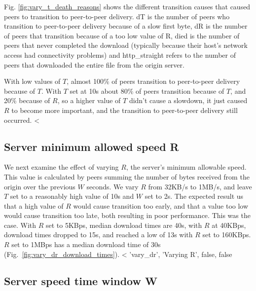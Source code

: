 Fig. \ref{fig:vary_t_death_reasons} shows the different transition causes that caused peers to transition to peer-to-peer delivery.  dT is the number
of peers who transition to peer-to-peer delivery because of a slow first byte, dR is the number of
peers that transition because of a too low value of R, died is the number of peers that never completed the download
(typically because their host's network access had connectivity problems) and http\_straight refers to the number of peers
that downloaded the entire file from the origin server.

With low values of $T$, almost 100\% of peers transition to peer-to-peer delivery because of $T$. With $T$ set at 10s
about 80\% of peers transition because of $T$, and 20\% because of $R$, so a higher value of $T$ didn't cause a slowdown, it
just caused $R$ to become more important, and the transition to peer-to-peer delivery still occurred.
<%

\subsection{Server minimum allowed speed R}

We next examine the effect of varying $R$, the server's minimum allowable speed.  This value is calculated 
by peers summing the number of bytes received from the origin over the previous $W$ seconds. We vary $R$ from 32KB/s to 1MB/s, and leave $T$ set to a 
reasonably high value of 10s and $W$ set to 2s. The expected result us that a high value of $R$ would cause transition 
too early, and that a value too low would cause transition too late, both resulting in poor performance. This was the case.  With $R$ set 
to 5KBps, median download times are 40s, with $R$ at 40KBps, download times dropped to 15s, and reached 
a low of 13s with $R$ set to 160KBps. $R$ set to 1MBps has a median download time of 30s (Fig.~\ref{fig:vary_dr_download_times}). 
<%
  'vary_dr', 'Varying R', false, false %

\subsection{Server speed time window W}

